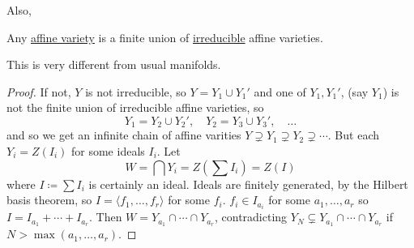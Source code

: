 \documentclass{article}
\begin{document}
\begin{eg}
    \leavevmode
    \begin{center}
    \end{center}
    Also,
    \begin{center}
    \end{center}
\end{eg}
\begin{prop}
    Any \hyperlink{def:Z}{affine variety} is a finite union of \hyperlink{def:reducible}{irreducible} affine varieties.
\end{prop}
\begin{remark}
    This is very different from usual manifolds.
\end{remark}
\begin{proof}
    If not, $Y$ is not irreducible, so $Y = Y_1 \cup Y_1'$ and one of $Y_1, Y_1'$, (say $Y_1$) is not the finite union of irreducible affine varieties, so
    \begin{equation*}
        Y_1 = Y_2 \cup Y_2',\quad Y_2 = Y_3 \cup Y_3',\quad \dotsc
    \end{equation*}
    and so we get an infinite chain of affine varities $Y \supsetneq Y_1 \supsetneq Y_2 \supsetneq \dotsb$.
    But each $Y_i = Z(I_i)$ for some ideals $I_i$.  Let
    \begin{equation*}
        W = \bigcap Y_i = Z\left(\sum I_i\right) = Z(I)
    \end{equation*}
    where $I \coloneqq \sum I_i$ is certainly an ideal.
    Ideals are finitely generated, by the Hilbert basis theorem, so $I = \langle f_1, \dotsc, f_r \rangle$ for some $f_i$.
    $f_i \in I_{a_i}$ for some $a_1, \dotsc, a_r$ so $I = I_{a_1} + \dotsb + I_{a_r}$.
    Then $W = Y_{a_1} \cap \dotsb \cap Y_{a_r}$, contradicting $Y_N \subsetneq Y_{a_1} \cap \dotsb \cap Y_{a_r}$ if $N > \max(a_1, \dotsc, a_r)$.
\end{proof}
\end{document}
